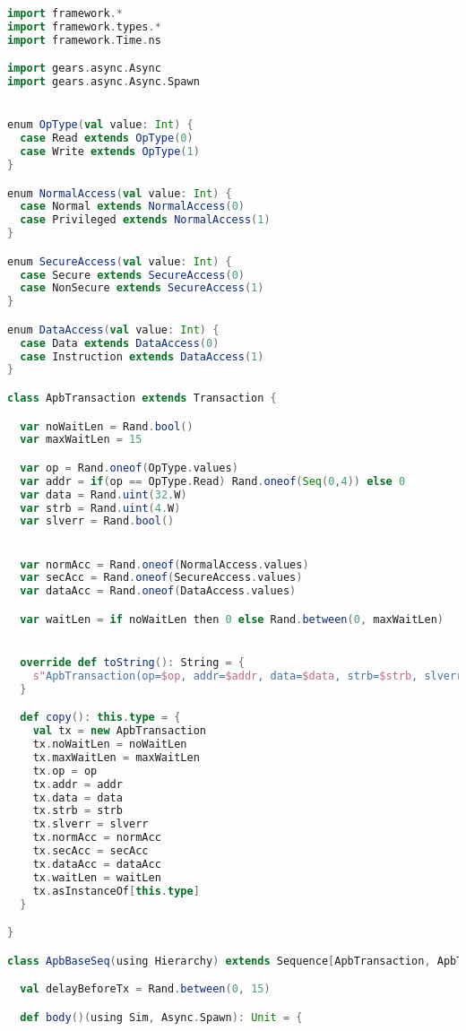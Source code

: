 \begin{lstlisting}[language=scala, captionpos=b, caption=Test code for the APB Didactic SoC subsystem.,label=lst:apb_test]
import framework.*
import framework.types.*
import framework.Time.ns

import gears.async.Async
import gears.async.Async.Spawn


enum OpType(val value: Int) {
  case Read extends OpType(0)
  case Write extends OpType(1)
}

enum NormalAccess(val value: Int) {
  case Normal extends NormalAccess(0)
  case Privileged extends NormalAccess(1)
}

enum SecureAccess(val value: Int) {
  case Secure extends SecureAccess(0)
  case NonSecure extends SecureAccess(1)
}

enum DataAccess(val value: Int) {
  case Data extends DataAccess(0)
  case Instruction extends DataAccess(1)
}

class ApbTransaction extends Transaction {

  var noWaitLen = Rand.bool()
  var maxWaitLen = 15

  var op = Rand.oneof(OpType.values)
  var addr = if(op == OpType.Read) Rand.oneof(Seq(0,4)) else 0
  var data = Rand.uint(32.W)
  var strb = Rand.uint(4.W)
  var slverr = Rand.bool()


  var normAcc = Rand.oneof(NormalAccess.values)
  var secAcc = Rand.oneof(SecureAccess.values)
  var dataAcc = Rand.oneof(DataAccess.values)

  var waitLen = if noWaitLen then 0 else Rand.between(0, maxWaitLen)


  override def toString(): String = {
    s"ApbTransaction(op=$op, addr=$addr, data=$data, strb=$strb, slverr=$slverr, normAcc=$normAcc, secAcc=$secAcc, dataAcc=$dataAcc, waitLen=$waitLen)"
  }

  def copy(): this.type = {
    val tx = new ApbTransaction
    tx.noWaitLen = noWaitLen
    tx.maxWaitLen = maxWaitLen
    tx.op = op
    tx.addr = addr
    tx.data = data
    tx.strb = strb
    tx.slverr = slverr
    tx.normAcc = normAcc
    tx.secAcc = secAcc
    tx.dataAcc = dataAcc
    tx.waitLen = waitLen
    tx.asInstanceOf[this.type]
  }

}

class ApbBaseSeq(using Hierarchy) extends Sequence[ApbTransaction, ApbTransaction] {

  val delayBeforeTx = Rand.between(0, 15)

  def body()(using Sim, Async.Spawn): Unit = {
    

\end{lstlisting}
